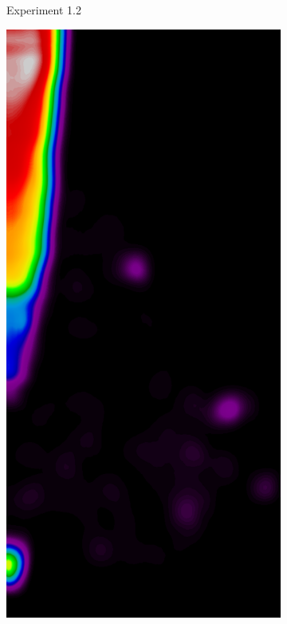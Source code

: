 \begin{figure}[h!]
\begin{subfigure}{0.195\textwidth}
		\caption{Experiment 1.2}
    \end{subfigure}
	\begin{subfigure}{0.195\textwidth}
		\centering
			\includegraphics[width=\textwidth]{plots/examples/example1_probs_1_3.png}

\end{subfigure}
\end{figure}
